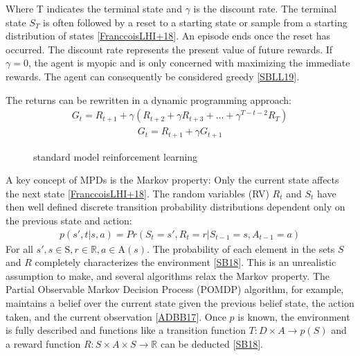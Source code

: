 \documentclass[letterpaper,10pt,english]{jupyterBook}
\let\sphinxpxdimen\pdfpxdimen\else\newdimen\sphinxpxdimen
\begin{document}
\sphinxAtStartPar
Where T indicates the terminal state and \(\gamma\) is the discount rate. The terminal state \(S_T\) is often followed by a reset to a starting state or sample from a starting distribution of states {[}\hyperlink{cite.Discussion:id72}{FranccoisLHI+18}{]}. An episode ends once the reset has occurred. The discount rate represents the present value of future rewards. If \(\gamma = 0\), the agent is myopic and is only concerned with maximizing the immediate rewards. The agent can consequently be considered greedy {[}\hyperlink{cite.Discussion:id53}{SBLL19}{]}.

\sphinxAtStartPar
The returns can be rewritten in a dynamic programming approach:
\begin{equation*}
\begin{split} G_t = R_{t+1} + \gamma(R_{t+2} + \gamma R_{t+3} + ... + \gamma^{T-t-2}R_T) \end{split}
\end{equation*}\begin{equation*}
\begin{split} G_t = R_{t+1} + \gamma G_{t+1}\end{split}
\end{equation*}
\begin{figure}[htbp]
\centering
\capstart

\noindent\sphinxincludegraphics[width=600\sphinxpxdimen,height=300\sphinxpxdimen]{{standard_model}.png}
\caption{standard model reinforcement learning}\label{\detokenize{Reinforcement_learning:standard-model-fig}}\end{figure}

\sphinxAtStartPar
A key concept of MPDs is the Markov property: Only the current state affects the next state {[}\hyperlink{cite.Discussion:id72}{FranccoisLHI+18}{]}. The random variables (RV) \(R_t\) and \(S_t\) have then well defined discrete transition probability distributions dependent only on the previous state and action:
\begin{equation*}
\begin{split} p(s', t| s, a) = Pr(S_t = s', R_t = r | S_{t-1} = s, A_{t-1}=a) \end{split}
\end{equation*}
\sphinxAtStartPar
For all \(s', s \in \mathrm{S} , r \in 	\mathbb{R}, a \in \mathrm{A}(s) \). The probability of each element in the sets \(S\) and \(R\) completely characterizes the environment {[}\hyperlink{cite.Discussion:id70}{SB18}{]}. This is an unrealistic assumption to make, and several algorithms relax the Markov property. The Partial Observable Markov Decision Process (POMDP) algorithm, for example, maintains a belief over the current state given the previous belief state, the action taken, and the current observation {[}\hyperlink{cite.Discussion:id63}{ADBB17}{]}.  Once \(p\) is known, the environment is fully described and functions like a transition function \(T : D \times A \to p(S)\) and a reward function \(R: S \times A \times S \to \mathbb{R}\) can be deducted {[}\hyperlink{cite.Discussion:id70}{SB18}{]}.
\end{document}
